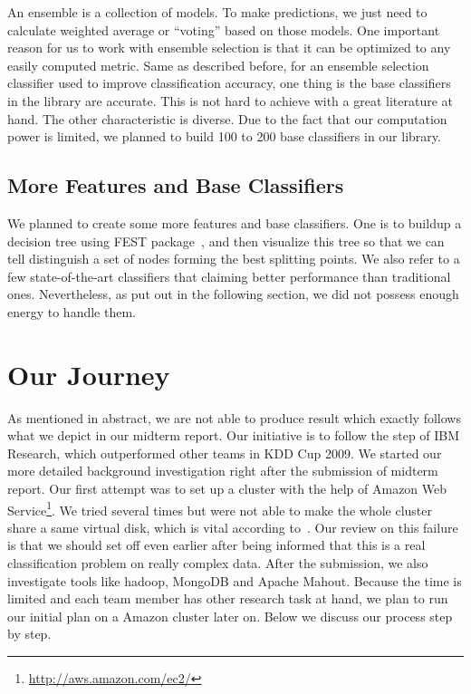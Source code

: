 \documentclass[journal]{IEEEtran}
\begin{document}
An ensemble is a collection of models. To make predictions, we just
need to calculate weighted average or ``voting'' based on those
models. One important reason for us to work with ensemble selection is
that it can be optimized to any easily computed metric. Same as
described before, for an ensemble selection classifier used to improve
classification accuracy, one thing is the base classifiers in the
library are accurate. This is not hard to achieve with a great
literature at hand. The other characteristic is diverse. Due to the
fact that our computation power is limited, we planned to build 100 to
200 base classifiers in our library. 

\subsection{More Features and Base Classifiers}
\label{sec:more-features-base}

We planned to create some more features and base classifiers. One is
to buildup a decision tree using FEST
package~\cite{Caruana:2008:EES:1390156.1390169}, and then visualize
this tree so that we can tell distinguish a set of nodes forming the
best splitting points. We also refer to a few state-of-the-art
classifiers that claiming better performance than traditional
ones. Nevertheless, as put out in the following section, we did not
possess enough energy to handle them.

\section{Our Journey}
\label{sec:revised-proposal}
As mentioned in abstract, we are not able to produce result which
exactly follows what we depict in our midterm report. Our initiative
is to follow the step of IBM Research, which outperformed other teams
in KDD Cup 2009. We started our more detailed background investigation
right after the submission of midterm report. Our first attempt was to
set up a cluster with the help of Amazon Web
Service\footnote{\url{http://aws.amazon.com/ec2/}}. We tried several
times but were not able to make the whole cluster share a same virtual
disk, which is vital according
to~\cite{ref:ensembleselectionnutshell}. Our review on this failure is
that we should set off even earlier after being informed that this is
a real classification problem on really complex data. After the
submission, we also investigate tools like hadoop, MongoDB and Apache
Mahout\cite{NIPS2006_725}. Because the time is limited and each team
member has other research task at hand, we plan to run our initial
plan on a Amazon cluster later on. Below we discuss our process step
by step.
\end{document}
